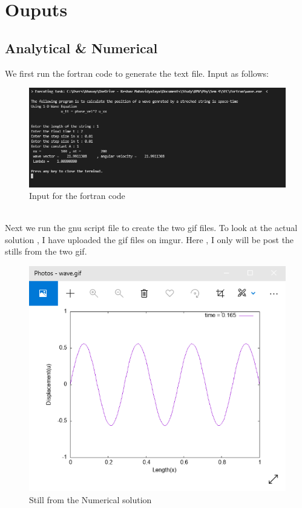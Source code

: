 \documentclass[oneside,hidelinks]{book}
\begin{document}
                \section{Ouputs}
                        \subsection{Analytical \& Numerical}
                        We first run the fortran code to generate the text file.
                        Input as follows:
                        \begin{figure}[hbtp]
                                \caption{Input for the fortran code}
                                \hspace*{1cm}\includegraphics[scale=0.7]{wave_fortran.png}        
                        \end{figure}\\
                        Next we run the gnu script file to create the two gif files. To look at the actual solution , I have uploaded 
                        the gif files on imgur. Here , I only will be post the stills from the two gif.\\
                        \begin{figure}[hbtp]
                                \caption{Still from the Numerical solution}
                                \hspace*{3cm}\includegraphics[scale=0.7]{wave_numerical.png}        
                        \end{figure}
\end{document}
